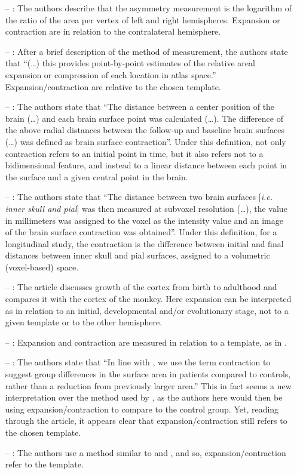 \begin{itemize}
\item[--] \citet{Lyttelton2009}: The authors describe that the asymmetry measurement is the logarithm of the ratio of the area per vertex of left and right hemispheres. Expansion or contraction are in relation to the contralateral hemisphere.
\item[--] \citet{Joyner2009}: After a brief description of the method of measurement, the authors state that ``(\ldots) this provides point-by-point estimates of the relative areal expansion or compression of each location in atlas space.'' Expansion/contraction are relative to the chosen template.
\item[--] \citet{Sun2009a}: The authors state that ``The distance between a center position of the brain (\ldots) and each brain surface point was calculated (\ldots). The difference of the above radial distances between the follow-up and baseline brain surfaces (\ldots) was defined as brain surface contraction''. Under this definition, not only contraction refers to an initial point in time, but it also refers not to a bidimensional feature, and instead to a linear distance between each point in the surface and a given central point in the brain.
\item[--] \citet{Sun2009}: The authors state that ``The distance between two brain surfaces [\emph{i.e. inner skull and pial}] was then measured at subvoxel resolution (\ldots), the value in millimeters was assigned to the voxel as the intensity value and an image of the brain surface contraction was obtained''. Under this definition, for a longitudinal study, the contraction is the difference between initial and final distances between inner skull and pial surfaces, assigned to a volumetric (voxel-based) space.
\item[--] \citet{Hill2010}: The article discusses growth of the cortex from birth to adulthood and compares it with the cortex of the monkey. Here expansion can be interpreted as in relation to an initial, developmental and/or evolutionary stage, not to a given template or to the other hemisphere.
\item[--] \citet{Rimol2010b}: Expansion and contraction are measured in relation to a template, as in \citet{Joyner2009}.
\item[--] \citet{Palaniyappan2011}: The authors state that ``In line with \citet{Joyner2009}, we use the term contraction to suggest group differences in the surface area in patients compared to controls, rather than a reduction from previously larger area.'' This in fact seems a new interpretation over the method used by \citet{Joyner2009}, as the authors here would then be using expansion/contraction to compare to the control group. Yet, reading through the article, it appears clear that expansion/contraction still refers to the chosen template.
\item[--] \citet{Chen2011_neuron,Chen2012}: The authors use a method similar to \citet{Joyner2009} and \citet{Rimol2010b}, and so, expansion/contraction refer to the template.
\end{itemize}

